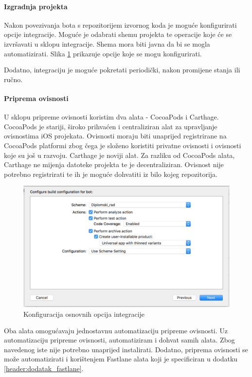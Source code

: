 \documentclass[times, utf8, diplomski, numeric]{fer}
\begin{document}
\begin{appendices}
\paragraph{Izgradnja projekta}

Nakon povezivanja bota s repozitorijem izvornog koda je moguće konfigurirati opcije integracije. Moguće je odabrati shemu projekta te operacije koje će se izvršavati u sklopu integracije. Shema mora biti javna da bi se mogla automatizirati. Slika \ref{fig:XcodeServerOptions} prikazuje opcije koje se mogu konfigurirati.

Dodatno, integraciju je moguće pokretati periodički, nakon promijene stanja ili ručno.

\paragraph{Priprema ovisnosti}

U sklopu pripreme ovisnosti koristim dva alata - CocoaPods i Carthage. CocoaPods je stariji, široko prihvaćen i centraliziran alat za upravljanje ovisnostima iOS projekata. Ovisnosti moraju biti unaprijed registrirane na CocoaPods platformi zbog čega je složeno koristiti privatne ovisnosti i ovisnosti koje su još u razvoju. Carthage je noviji alat. Za razliku od CocoaPods alata, Carthage ne mijenja datoteke projekta te je decentraliziran. Ovisnost nije potrebno registrirati te ih je moguće dohvatiti iz bilo kojeg repozitorija.

\begin{figure}
\centering
\includegraphics[scale=0.5]{XcodeServerOptions}
\caption{Konfiguracija osnovnih opcija integracije}
\label{fig:XcodeServerOptions}
\end{figure}

Oba alata omogućavaju jednostavnu automatizaciju pripreme ovisnosti. Uz automatizaciju pripreme ovisnosti, automatiziram i dohvat samih alata. Zbog navedenog iste nije potrebno unaprijed instalirati. Dodatno, priprema ovisnosti se može automatizirati i korištenjem Fastlane alata koji je specificiran u dodatku \ref{header:dodatak_fastlane}.


\end{appendices}
\end{document}
